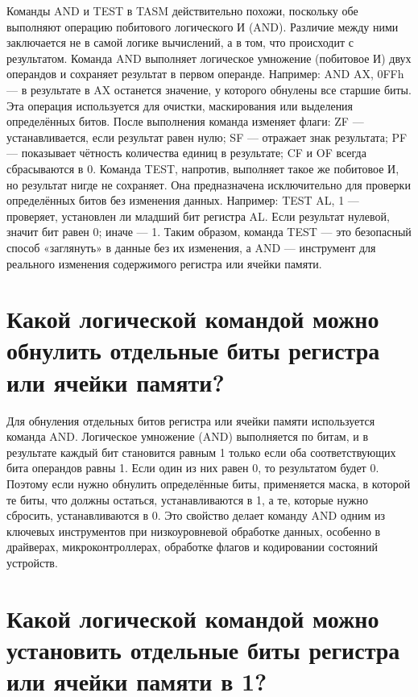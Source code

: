 Команды AND и TEST в TASM действительно похожи, поскольку обе выполняют операцию побитового логического И (AND).
Различие между ними заключается не в самой логике вычислений, а в том, что происходит с результатом.
Команда AND выполняет логическое умножение (побитовое И) двух операндов и сохраняет результат в первом операнде.
Например:
AND AX, 0FFh — в результате в AX останется значение, у которого обнулены все старшие биты.
Эта операция используется для очистки, маскирования или выделения определённых битов.
После выполнения команда изменяет флаги:
ZF — устанавливается, если результат равен нулю;
SF — отражает знак результата;
PF — показывает чётность количества единиц в результате;
CF и OF всегда сбрасываются в 0.
Команда TEST, напротив, выполняет такое же побитовое И, но результат нигде не сохраняет.
Она предназначена исключительно для проверки определённых битов без изменения данных.
Например:
TEST AL, 1 — проверяет, установлен ли младший бит регистра AL.
Если результат нулевой, значит бит равен 0; иначе — 1.
Таким образом, команда TEST — это безопасный способ «заглянуть» в данные без их изменения, а AND — инструмент для реального изменения содержимого регистра или ячейки памяти.

\section{ Какой логической командой можно обнулить отдельные биты регистра или ячейки памяти?}

Для обнуления отдельных битов регистра или ячейки памяти используется команда AND.
Логическое умножение (AND) выполняется по битам, и в результате каждый бит становится равным 1 только если оба соответствующих бита операндов равны 1.
Если один из них равен 0, то результатом будет 0.
Поэтому если нужно обнулить определённые биты, применяется маска, в которой те биты, что должны остаться, устанавливаются в 1, а те, которые нужно сбросить, устанавливаются в 0.
Это свойство делает команду AND одним из ключевых инструментов при низкоуровневой обработке данных, особенно в драйверах, микроконтроллерах, обработке флагов и кодировании состояний устройств.


\section{Какой логической командой можно установить отдельные биты регистра или ячейки памяти в 1?}

